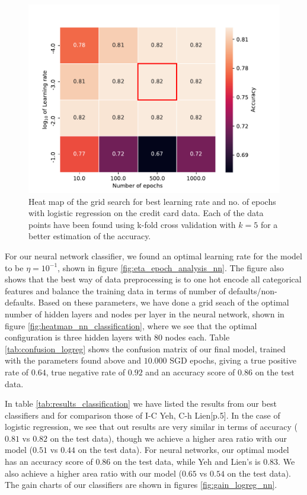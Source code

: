 \begin{figure}[!h]
    \centering
    \includegraphics[scale=0.6]{Figures/Classification/020_logistic_heatmap_CC_bal_all1h_on_val.pdf}
    \caption{Heat map of the grid search for best learning rate and no. of epochs with logistic regression on the credit card data. Each of the data points have been found using k-fold cross validation with $k=5$ for a better estimation of the accuracy.}
    \label{fig:heatmap_logreg}
\end{figure}


For our neural network classifier, we found an optimal learning rate for the model to be $\eta = 10^{-1}$, shown in figure \ref{fig:eta_epoch_analysis_nn}. The figure also shows that the best way of data preprocessing is to one hot encode all categorical features and balance the training data in terms of number of defaults/non-defaults. Based on these parameters, we have done a grid seach of the optimal number of hidden layers and nodes per layer in the neural network, shown in figure \ref{fig:heatmap_nn_classification}, where we see that the  optimal configuration is three hidden layers with $80$ nodes each. Table \ref{tab:confusion_logreg} shows the confusion matrix of our final model, trained with the parameters found above and $10.000$ SGD epochs, giving a true positive rate of $0.64$, true negative rate of $0.92$ and an accuracy score of $0.86$ on the test data. 

In table \ref{tab:results_classification} we have listed the results from our best classifiers and for comparison those of I-C Yeh, C-h Lien\cite{YehLien}[p.5]. In the case of logistic regression, we see that out results are very similar in terms of accuracy ($0.81$ vs $0.82$ on the test data), though we achieve a higher area ratio with our model ($0.51$ vs $0.44$ on the test data). For neural networks, our optimal model has an accuracy score of $0.86$ on the test data, while Yeh and Lien's is $0.83$. We also achieve a higher area ratio with our model ($0.65$ vs $0.54$ on the test data). The gain charts of our classifiers are shown in figures \ref{fig:gain_logreg_nn}.


